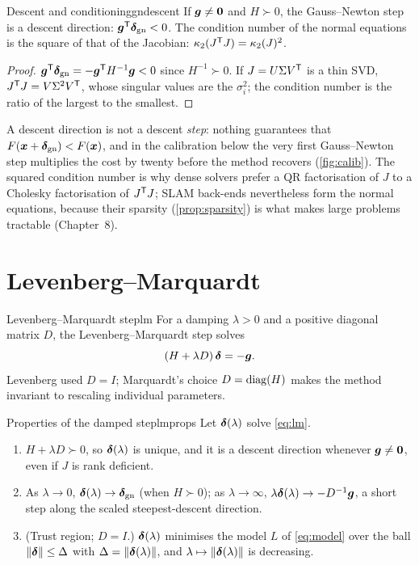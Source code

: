 \begin{lemma}{Descent and conditioning}{gndescent}
If $\bm{g}\neq\bm{0}$ and $H\succ0$, the Gauss--Newton step is a
descent direction: $\bm{g}^{\mathsf{T}}\bm{\delta}_{\mathrm{gn}}<0$. The
condition number of the normal equations is the square of that of the
Jacobian: $\kappa_2(J^{\mathsf{T}} J)=\kappa_2(J)^2$.
\end{lemma}

\begin{proof}
$\bm{g}^{\mathsf{T}}\bm{\delta}_{\mathrm{gn}}=-\bm{g}^{\mathsf{T}} H^{-1}\bm{g}<0$ since
$H^{-1}\succ0$. If $J=U\Sigma V^{\mathsf{T}}$ is a thin SVD, $J^{\mathsf{T}} J=V\Sigma^2V^{\mathsf{T}}$,
whose singular values are the $\sigma_i^2$; the condition number is the
ratio of the largest to the smallest.
\end{proof}

A descent direction is not a descent \emph{step}: nothing guarantees that
$F(\bm{x}+\bm{\delta}_{\mathrm{gn}})<F(\bm{x})$, and in the calibration below the
very first Gauss--Newton step multiplies the cost by twenty before the
method recovers (\cref{fig:calib}). The squared condition number is why
dense solvers prefer a QR factorisation of $J$ to a Cholesky
factorisation of $J^{\mathsf{T}} J$; SLAM back-ends nevertheless form the normal
equations, because their sparsity (\cref{prop:sparsity}) is what makes
large problems tractable (Chapter~8).

\section{Levenberg--Marquardt}

\begin{definition}{Levenberg--Marquardt step}{lm}
For a damping $\lambda>0$ and a positive diagonal matrix $D$, the
Levenberg--Marquardt step solves
\begin{equation}\label{eq:lm}
(H+\lambda D)\,\bm{\delta}=-\bm{g}.
\end{equation}
Levenberg used $D=I$; Marquardt's choice $D=\operatorname{diag}(H)$ makes the method
invariant to rescaling individual parameters.
\end{definition}

\begin{proposition}{Properties of the damped step}{lmprops}
Let $\bm{\delta}(\lambda)$ solve \eqref{eq:lm}.
\begin{enumerate}[label=(\roman*),nosep]
\item $H+\lambda D\succ0$, so $\bm{\delta}(\lambda)$ is unique, and it is
  a descent direction whenever $\bm{g}\neq\bm{0}$, even if $J$ is rank
  deficient.
\item As $\lambda\to0$, $\bm{\delta}(\lambda)\to\bm{\delta}_{\mathrm{gn}}$
  (when $H\succ0$); as $\lambda\to\infty$,
  $\lambda\bm{\delta}(\lambda)\to-D^{-1}\bm{g}$, a short step along the
  scaled steepest-descent direction.
\item (Trust region; $D=I$.) $\bm{\delta}(\lambda)$ minimises the model
  $L$ of \eqref{eq:model} over the ball $\left\lVert \bm{\delta}\right\rVert\le\Delta$
  with $\Delta=\left\lVert \bm{\delta}(\lambda)\right\rVert$, and
  $\lambda\mapsto\left\lVert \bm{\delta}(\lambda)\right\rVert$ is decreasing.
\end{enumerate}
\end{proposition}


